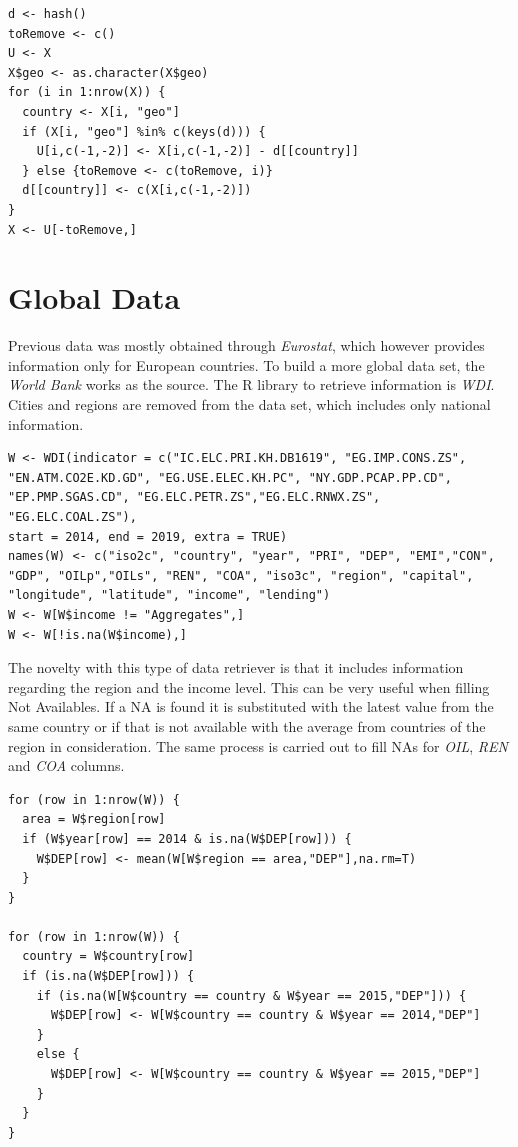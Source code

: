 \documentclass[a4paper,12pt]{book}
\begin{document}
\begin{appendices}
\begin{verbatim}
d <- hash()
toRemove <- c()
U <- X
X$geo <- as.character(X$geo)
for (i in 1:nrow(X)) {
  country <- X[i, "geo"]
  if (X[i, "geo"] %in% c(keys(d))) {
    U[i,c(-1,-2)] <- X[i,c(-1,-2)] - d[[country]]
  } else {toRemove <- c(toRemove, i)}
  d[[country]] <- c(X[i,c(-1,-2)])
}
X <- U[-toRemove,]
\end{verbatim}

\section*{Global Data}

Previous data was mostly obtained through \textit{Eurostat}, which however provides information only for European countries. To build a more global data set, the \textit{World Bank} works as the source. The R library to retrieve information is \textit{WDI}. Cities and regions are removed from the data set, which includes only national information.

\begin{verbatim}
W <- WDI(indicator = c("IC.ELC.PRI.KH.DB1619", "EG.IMP.CONS.ZS",
"EN.ATM.CO2E.KD.GD", "EG.USE.ELEC.KH.PC", "NY.GDP.PCAP.PP.CD",
"EP.PMP.SGAS.CD", "EG.ELC.PETR.ZS","EG.ELC.RNWX.ZS", "EG.ELC.COAL.ZS"),
start = 2014, end = 2019, extra = TRUE) 
names(W) <- c("iso2c", "country", "year", "PRI", "DEP", "EMI","CON",
"GDP", "OILp","OILs", "REN", "COA", "iso3c", "region", "capital",
"longitude", "latitude", "income", "lending")
W <- W[W$income != "Aggregates",]
W <- W[!is.na(W$income),]
\end{verbatim}

The novelty with this type of data retriever is that it includes information regarding the region and the income level. This can be very useful when filling Not Availables. If a NA is found it is substituted with the latest value from the same country or if that is not available with the average from countries of the region in consideration. The same process is carried out to fill NAs for \textit{OIL}, \textit{REN} and \textit{COA} columns.

\begin{verbatim}
for (row in 1:nrow(W)) {
  area = W$region[row]
  if (W$year[row] == 2014 & is.na(W$DEP[row])) {
    W$DEP[row] <- mean(W[W$region == area,"DEP"],na.rm=T)
  }
}

for (row in 1:nrow(W)) {
  country = W$country[row]
  if (is.na(W$DEP[row])) {
    if (is.na(W[W$country == country & W$year == 2015,"DEP"])) {
      W$DEP[row] <- W[W$country == country & W$year == 2014,"DEP"]
    }
    else {
      W$DEP[row] <- W[W$country == country & W$year == 2015,"DEP"]
    }
  }
} 
\end{verbatim}


\end{appendices}
\end{document}
